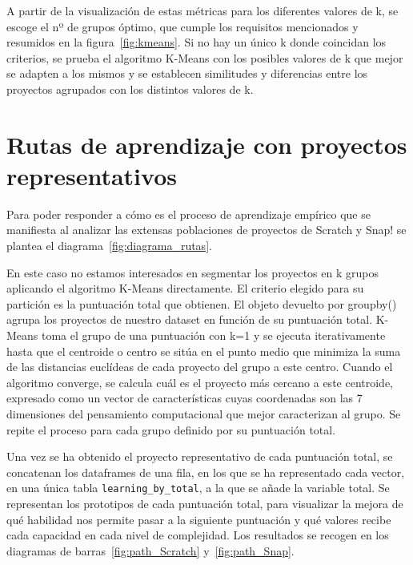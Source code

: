 \documentclass[a4paper, 12pt]{book}
\begin{document}
A partir de la visualización de estas métricas para los diferentes valores de k, se escoge el nº de grupos óptimo, que cumple los requisitos mencionados y resumidos en la figura~\ref{fig:kmeans}. Si no hay un único k donde coincidan los criterios, se prueba el algoritmo K-Means con los posibles valores de k que mejor se adapten a los mismos y se establecen similitudes y diferencias entre los proyectos agrupados con los distintos valores de k.

\section{Rutas de aprendizaje con proyectos representativos}  
\label{sec:rutas_diseño}

Para poder responder a cómo es el proceso de aprendizaje empírico que se manifiesta al analizar las extensas poblaciones de proyectos de Scratch y Snap! se plantea el diagrama~\ref{fig:diagrama_rutas}. 

En este caso no estamos interesados en segmentar los proyectos en k grupos aplicando el algoritmo K-Means directamente. El criterio elegido para su partición es la puntuación total que obtienen. El objeto devuelto por groupby() agrupa los proyectos de nuestro dataset en función de su puntuación total. K-Means toma el grupo de una puntuación con k=1 y se ejecuta iterativamente hasta que el centroide o centro se sitúa en el punto medio que minimiza la suma de las distancias euclídeas de cada proyecto del grupo a este centro. Cuando el algoritmo converge, se calcula cuál es el proyecto más cercano a este centroide, expresado como un vector de características cuyas coordenadas son las 7 dimensiones del pensamiento computacional que mejor caracterizan al grupo. Se repite el proceso para cada grupo definido por su puntuación total.

Una vez se ha obtenido el proyecto representativo de cada puntuación total, se concatenan los dataframes de una fila, en los que se ha representado cada vector, en una única tabla \texttt{learning\_by\_total}, a la que se añade la variable total. Se representan los prototipos de cada puntuación total, para visualizar la mejora de qué habilidad nos permite pasar a la siguiente puntuación y qué valores recibe cada capacidad en cada nivel de complejidad. Los resultados se recogen en los diagramas de barras~\ref{fig:path_Scratch} y~\ref{fig:path_Snap}.
\end{document}
